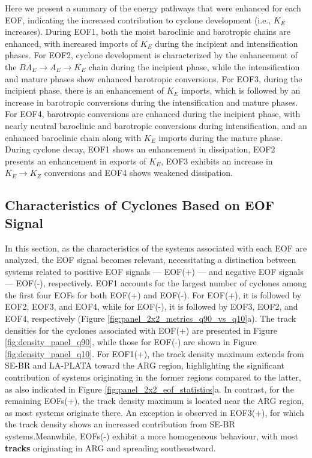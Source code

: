 \documentclass[pdflatex,sn-chicago]{sn-jnl}%
\theoremstyle{plain}
\theoremstyle{definition}
\theoremstyle{remark}
\theoremstyle{definition}
\begin{document}
Here we present a summary of the energy pathways that were enhanced for each EOF, indicating the increased contribution to cyclone development (i.e., $K_E$ increases). During EOF1, both the moist baroclinic and barotropic chains are enhanced, with increased imports of $K_E$ during the incipient and intensification phases. For EOF2, cyclone development is characterized by the enhancement of the $BA_E \rightarrow A_E \rightarrow K_E$ chain during the incipient phase, while the intensification and mature phases show enhanced barotropic conversions. For EOF3, during the incipient phase, there is an enhancement of $K_E$ imports, which is followed by an increase in barotropic conversions during the intensification and mature phases. For EOF4, barotropic conversions are enhanced during the incipient phase, with nearly neutral baroclinic and barotropic conversions during intensification, and an enhanced baroclinic chain along with $K_E$ imports during the mature phase. During cyclone decay, EOF1 shows an enhancement in dissipation, EOF2 presents an enhancement in exports of $K_E$, EOF3 exhibits an increase in $K_E \rightarrow K_Z$ conversions and EOF4 shows weakened dissipation.

\subsection{Characteristics of Cyclones Based on EOF Signal}\label{sec:eof_statistics}

In this section, as the characteristics of the systems associated with each EOF are analyzed, the EOF signal becomes relevant, necessitating a distinction between systems related to positive EOF signals — EOF(+) — and negative EOF signals — EOF(-), respectively. EOF1 accounts for the largest number of cyclones among the first four EOFs for both EOF(+) and EOF(-). For EOF(+), it is followed by EOF2, EOF3, and EOF4, while for EOF(-), it is followed by EOF3, EOF2, and EOF4, respectively (Figure \ref{fig:panel_2x2_metrics_q90_vs_q10}a). 
The track densities for the cyclones associated with EOF(+) are presented in Figure \ref{fig:density_panel_q90}, while those for EOF(-) are shown in Figure \ref{fig:density_panel_q10}. For EOF1(+), the track density maximum extends from SE-BR and LA-PLATA toward the ARG region, highlighting the significant contribution of systems originating in the former regions compared to the latter, as also indicated in Figure \ref{fig:panel_2x2_eof_statistics}a. In contrast, for the remaining EOFs(+), the track density maximum is located near the ARG region, as most systems originate there. An exception is observed in EOF3(+), for which the track density shows an increased contribution from SE-BR systems.Meanwhile, EOFs(-) exhibit a more homogeneous behaviour, with most \textbf{tracks} originating in ARG and spreading southeastward.
\end{document}
